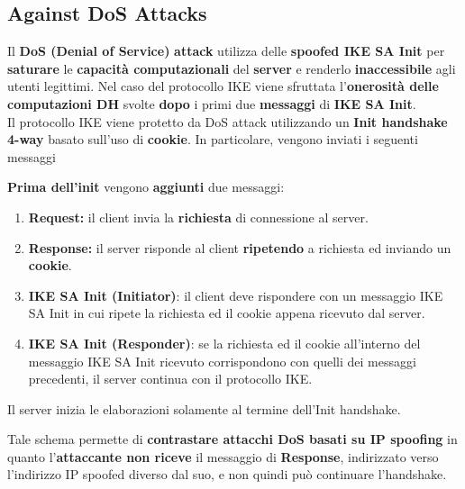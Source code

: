 \subsection{Against DoS Attacks}
Il \textbf{DoS (Denial of Service)} \textbf{attack} utilizza delle \textbf{spoofed IKE SA Init} per \textbf{saturare} le \textbf{capacità computazionali} del \textbf{server} e renderlo \textbf{inaccessibile} agli utenti legittimi. Nel caso del protocollo IKE viene sfruttata l’\textbf{onerosità delle computazioni DH} svolte \textbf{dopo} i primi due \textbf{messaggi} di \textbf{IKE SA Init}.\\
Il protocollo IKE viene protetto da DoS attack utilizzando un \textbf{Init handshake 4-way} basato sull’uso di \textbf{cookie}. In particolare, vengono inviati i seguenti messaggi
\begin{definition}
\textbf{Prima dell'init} vengono \textbf{aggiunti} due messaggi:
\begin{enumerate}
    \item \textbf{Request:} il client invia la \textbf{richiesta} di connessione al server.
    \item \textbf{Response:} il server risponde al client \textbf{ripetendo} a richiesta ed inviando un \textbf{cookie}.
    \item \textbf{IKE SA Init (Initiator)}: il client deve rispondere con un messaggio IKE SA Init in cui ripete la richiesta ed il cookie appena ricevuto dal server.
    \item \textbf{IKE SA Init (Responder)}: se la richiesta ed il cookie all’interno del messaggio IKE SA Init ricevuto corrispondono con quelli dei messaggi precedenti, il server continua con il protocollo IKE.
\end{enumerate}
Il server inizia le elaborazioni solamente al termine dell’Init handshake. 
\end{definition}
\begin{note}
Tale schema permette di \textbf{contrastare attacchi DoS basati su IP spoofing} in quanto l’\textbf{attaccante non riceve} il messaggio di \textbf{Response}, indirizzato verso l’indirizzo IP spoofed diverso dal suo, e non quindi può continuare l’handshake.
\end{note}
